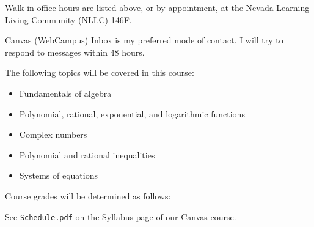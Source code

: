 \documentclass{syllabus}
\begin{document}
\maketitle

Walk-in office hours are listed above, or by appointment, at the
Nevada Learning Living Community (NLLC) 146F.

Canvas (WebCampus) Inbox is my preferred mode of contact.
I will try to respond to messages within 48 hours.

The following topics will be covered in this course:
\begin{itemize}
	\item Fundamentals of algebra
	\item Polynomial, rational, exponential, and logarithmic functions
	\item Complex numbers
	\item Polynomial and rational inequalities
	\item Systems of equations
\end{itemize}

Course grades will be determined as follows:


See \texttt{Schedule.pdf} on the Syllabus page of our Canvas course.
\end{document}

